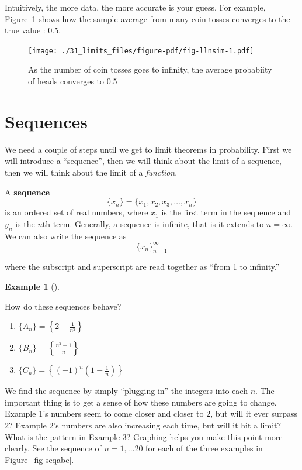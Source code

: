 \documentclass[
  letterpaper,
]{book}
\providecommand{\tightlist}{%
  \setlength{\itemsep}{0pt}\setlength{\parskip}{0pt}}\usepackage{longtable,booktabs,array}
\theoremstyle{definition}
\theoremstyle{definition}
\newtheorem{example}{Example}[chapter]
\theoremstyle{plain}
\theoremstyle{definition}
\theoremstyle{plain}
\theoremstyle{plain}
\theoremstyle{remark}
\begin{document}
Intuitively, the more data, the more accurate is your guess. For
example, Figure~\ref{fig-llnsim} shows how the sample average from many
coin tosses converges to the true value : 0.5.

\begin{figure}

{\centering \texttt{[image: ./31\_limits\_files/figure-pdf/fig-llnsim-1.pdf]}

}

\caption{\label{fig-llnsim}As the number of coin tosses goes to
infinity, the average probabiity of heads converges to 0.5}

\end{figure}

\hypertarget{sequences}{%
\section{Sequences}\label{sequences}}

We need a couple of steps until we get to limit theorems in probability.
First we will introduce a ``sequence'', then we will think about the
limit of a sequence, then we will think about the limit of a
\emph{function}.

A \textbf{sequence} \[\{x_n\}=\{x_1, x_2, x_3, \ldots, x_n\}\] is an
ordered set of real numbers, where \(x_1\) is the first term in the
sequence and \(y_n\) is the \(n\)th term. Generally, a sequence is
infinite, that is it extends to \(n=\infty\). We can also write the
sequence as \[\{x_n\}^\infty_{n=1}\]

where the subscript and superscript are read together as ``from 1 to
infinity.''

\leavevmode{}%
\begin{example}[]\label{exm-seqbehav}

How do these sequences behave?

\begin{enumerate}
\def\labelenumi{\arabic{enumi}.}
\tightlist
\item
  \(\{A_n\}=\left\{ 2-\frac{1}{n^2} \right\}\)
\item
  \(\{B_n\}=\left\{\frac{n^2+1}{n} \right\}\)
\item
  \(\{C_n\}=\left\{(-1)^n \left(1-\frac{1}{n}\right) \right\}\)
\end{enumerate}

\end{example}

We find the sequence by simply ``plugging in'' the integers into each
\(n\). The important thing is to get a sense of how these numbers are
going to change. Example 1's numbers seem to come closer and closer to
2, but will it ever surpass 2? Example 2's numbers are also increasing
each time, but will it hit a limit? What is the pattern in Example 3?
Graphing helps you make this point more clearly. See the sequence of
\(n = 1, ...20\) for each of the three examples in
Figure~\ref{fig-seqabc}.
\end{document}

